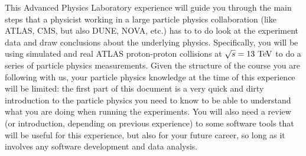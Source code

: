 
This Advanced Physics Laboratory experience will guide you through the main steps that a physicist working in a large particle physics collaboration (like ATLAS, CMS, but also DUNE, NOVA, etc.) has to to do look at the experiment data and draw conclusions about the underlying physics. Specifically, you will be using simulated and real ATLAS proton-proton collisions at $\sqrt{s} = 13\ \TeV$ to do a series of particle physics measurements. Given the structure of the course you are following with us, your particle physics knowledge at the time of this experience will be limited: the first part of this document is a very quick and dirty introduction to the particle physics you need to know to be able to understand what you are doing when running the experiments. You will also need a review (or introduction, depending on previous experience) to some software tools that will be useful for this experience, but also for your future career, so long as it involves any software development and data analysis. 
